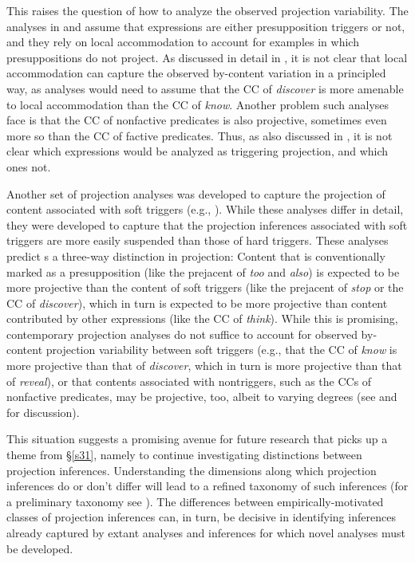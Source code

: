 \documentclass[11pt,fleqn]{article}
\newcommand{\6}{\mbox{$[\hspace*{-.6mm}[$}}
\newcommand{\9}{\mbox{$]\hspace*{-.6mm}]$}}
\begin{document}
This raises the question of how to analyze the observed projection variability. The analyses in \citealt{heim83} and \citealt{vds92} assume that expressions are either presupposition triggers or not, and they rely on local accommodation to account for examples in which presuppositions do not project.  As discussed in detail in \citealt{tbd-variability}, it is not clear that local accommodation can capture the observed by-content variation in a principled way, as analyses would need to assume that the CC of {\em discover} is more amenable to local accommodation than the CC of {\em know}. Another problem such analyses face is that the CC of nonfactive predicates is also projective, sometimes even more so than the CC of factive predicates. Thus, as also discussed in \citealt{degen-tonhauser-language}, it is not clear which expressions would be analyzed as triggering projection, and which ones not.

Another set of projection analyses was developed to capture the projection of content associated with soft triggers (e.g., \citealt{abusch02,abusch10, abrusan2011,abrusan2016,romoli2015,simons-etal2017}). While these analyses differ in detail, they were developed to capture that the projection inferences associated with soft triggers are more easily suspended than those of hard triggers. These analyses predict s a three-way distinction in projection: Content that is conventionally marked as a presupposition (like the prejacent of {\em too} and {\em also}) is expected to be more projective than the content of soft triggers (like the prejacent of {\em stop} or the CC of {\em discover}), which in turn is expected to be more projective than content contributed by other expressions (like the CC of {\em think}). While this is promising, contemporary projection analyses do not suffice to account for observed by-content projection variability between soft triggers (e.g., that the CC of {\em know} is more projective than that of {\em discover}, which in turn is more projective than that of {\em reveal}), or that contents associated with nontriggers, such as the CCs of nonfactive predicates, may be projective, too, albeit to varying degrees (see \citealt{tbd-variability} and \citealt{degen-tonhauser-language} for discussion). 

This situation suggests a promising avenue for future research that picks up a theme from \S\ref{s31}, namely to continue investigating distinctions between projection inferences. Understanding the dimensions along which projection inferences do or don't differ will lead to a refined taxonomy of such inferences (for a preliminary taxonomy see \citealt{brst-lang11}). The differences between empirically-motivated classes of projection inferences can, in turn, be decisive in identifying inferences already captured by extant analyses and inferences for which novel analyses must be developed.
\end{document}
